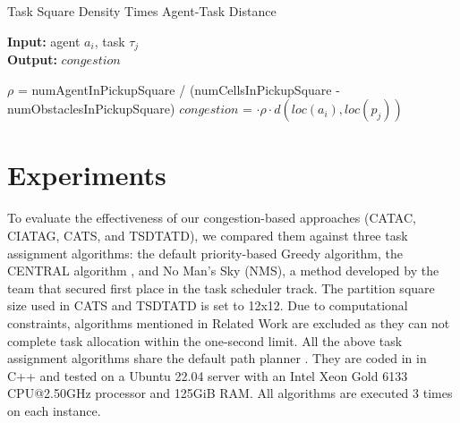\documentclass[letterpaper]{article} %
\begin{document}
\begin{algorithm}
    \caption{Task Square Density Times Agent-Task Distance}
    \label{alg:adaptive_jam_task_region_current_density_times_agent_pickup} 
    \textbf{Input:} agent $a_i$, task $\tau_j$ \\
    \textbf{Output:} $congestion$
    \begin{algorithmic}[1]

    \STATE $\rho$ = numAgentInPickupSquare / (numCellsInPickupSquare - numObstaclesInPickupSquare)          
    \STATE $congestion$ = $ \cdot \rho \cdot d(loc(a_i), loc(p_j))$ 

    \end{algorithmic}
\end{algorithm}


\section{Experiments}



To evaluate the effectiveness of our congestion-based approaches (CATAC, CIATAG, CATS, and TSDTATD), we compared them against three task assignment algorithms: the default priority-based Greedy algorithm, the CENTRAL algorithm \cite{ma2017lifelong}, and No Man’s Sky (NMS), a method developed by the team that secured first place in the task scheduler track. 
The partition square size used in CATS and TSDTATD is set to 12x12. 
Due to computational constraints, algorithms mentioned in Related Work are excluded as they can not complete task allocation within the one-second limit. 
All the above task assignment algorithms share the default path planner \cite{chen2024traffic}. 
They are coded in in C++ and tested on a Ubuntu 22.04 server with an Intel Xeon Gold 6133 CPU@2.50GHz processor and 125GiB RAM. 
All algorithms are executed 3 times on each instance. 

\end{document}
